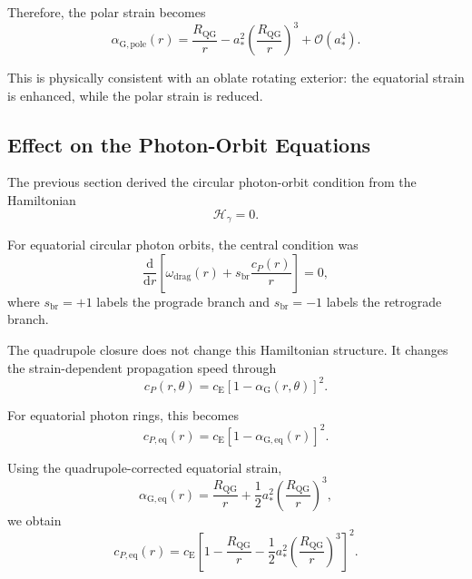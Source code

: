 Therefore, the polar strain becomes
\begin{equation}
    \boxed{ \alpha_{\mathrm{G},\mathrm{pole}}(r) = \frac{R_{\mathrm{QG}}}{r} - a_\ast^2 \left( \frac{R_{\mathrm{QG}}}{r} \right)^3 + \mathcal{O}(a_\ast^4). }
\end{equation}

This is physically consistent with an oblate rotating exterior: the equatorial strain is enhanced, while the polar strain is reduced.

\subsection{Effect on the Photon-Orbit Equations}

The previous section derived the circular photon-orbit condition from the Hamiltonian
\begin{equation}
    \mathcal{H}_{\gamma} = 0.
\end{equation}

For equatorial circular photon orbits, the central condition was
\begin{equation}
    \frac{\mathrm{d}}{\mathrm{d}r} \left[ \omega_{\mathrm{drag}}(r) + s_{\mathrm{br}} \frac{c_P(r)}{r} \right] = 0,
\end{equation}
where $s_{\mathrm{br}}=+1$ labels the prograde branch and $s_{\mathrm{br}}=-1$ labels the retrograde branch.

The quadrupole closure does not change this Hamiltonian structure. It changes the strain-dependent propagation speed through
\begin{equation}
    c_P(r,\theta) = c_{\mathrm{E}} \left[ 1-\alpha_{\mathrm{G}}(r,\theta) \right]^2.
\end{equation}

For equatorial photon rings, this becomes
\begin{equation}
    c_{P,\mathrm{eq}}(r) = c_{\mathrm{E}} \left[ 1-\alpha_{\mathrm{G},\mathrm{eq}}(r) \right]^2.
\end{equation}

Using the quadrupole-corrected equatorial strain,
\begin{equation}
    \alpha_{\mathrm{G},\mathrm{eq}}(r) = \frac{R_{\mathrm{QG}}}{r} + \frac{1}{2} a_\ast^2 \left( \frac{R_{\mathrm{QG}}}{r} \right)^3,
\end{equation}
we obtain
\begin{equation}
    \boxed{ c_{P,\mathrm{eq}}(r) = c_{\mathrm{E}} \left[ 1 - \frac{R_{\mathrm{QG}}}{r} - \frac{1}{2} a_\ast^2 \left( \frac{R_{\mathrm{QG}}}{r} \right)^3 \right]^2. }
\end{equation}

